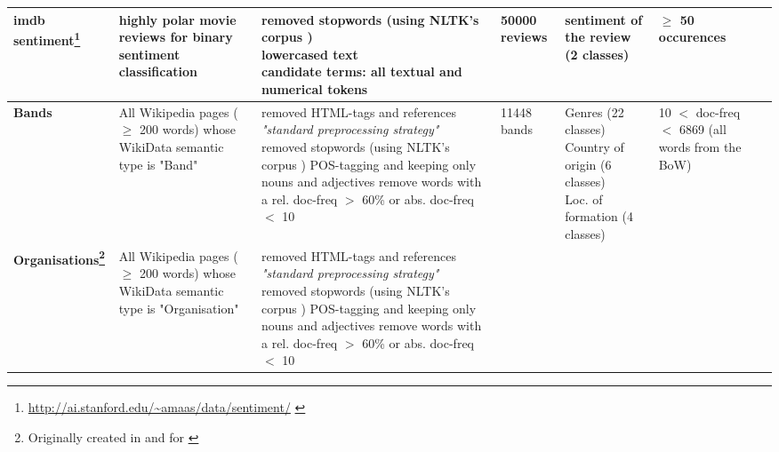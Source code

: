 {\begin{landscape}
\begin{table}[]
{\begin{tabular}{@{}lllllll@{}}
					\\ \midrule
				\textbf{imdb sentiment\footnote{\url{http://ai.stanford.edu/~amaas/data/sentiment/} \cite{maas-EtAl:2011:ACL-HLT2011}} \cite{Ager2018}} &
					highly polar movie reviews for binary sentiment classification  &
					\specialcell[l]{ \tabitem removed stopwords (using NLTK's corpus \cite{loper-bird-2002-nltk})\\ \tabitem lowercased text\\ \tabitem candidate terms: all textual and numerical tokens} &
					50000 reviews &
					\tabitem sentiment of the review (2 classes) &
					$\geq$ 50 occurences
					\\ \midrule
				\textbf{Bands \cite{Alshaikh2020}} &
					\specialcell[l]{All Wikipedia pages ($\geq$ 200 words) whose \\ WikiData semantic type is "Band"} &
					\specialcell[l]{ \tabitem removed HTML-tags and references \\ \tabitem \textit{"standard preprocessing strategy"} \cite[137]{Alshaikh2019} \\ \tabitem removed stopwords (using NLTK's corpus \cite{loper-bird-2002-nltk})\\ \tabitem POS-tagging and keeping only nouns and adjectives \\ \tabitem remove words with a rel. doc-freq  $>$ 60\% or abs. doc-freq $<$ 10 } &
					11448 bands & \specialcell[l]{ \tabitem Genres (22 classes) \\ \tabitem Country of origin (6 classes) \\ \tabitem Loc. of formation (4 classes) }  & 
					\specialcell[l]{ 10 $<$ doc-freq $<$ 6869 \\ (all words from the BoW)}\\ \midrule
				\textbf{Organisations\footnote{\label{fnote:for_alshaikh2019} Originally created in and for \cite{Alshaikh2019}} \cite{Alshaikh2020}} &
					\specialcell[l]{All Wikipedia pages ($\geq$ 200 words) whose \\ WikiData semantic type is "Organisation"} &
					\specialcell[l]{ \tabitem removed HTML-tags and references \\ \tabitem \textit{"standard preprocessing strategy"} \cite[137]{Alshaikh2019} \\ \tabitem removed stopwords (using NLTK's corpus \cite{loper-bird-2002-nltk})\\ \tabitem POS-tagging and keeping only nouns and adjectives \\ \tabitem remove words with a rel. doc-freq  $>$ 60\% or abs. doc-freq $<$ 10 } &

\end{tabular}}
\end{table}
\end{landscape}}
